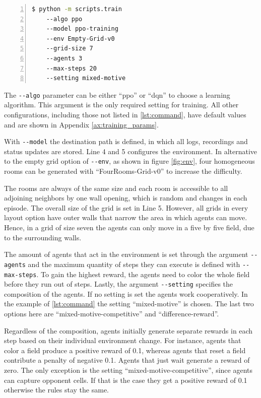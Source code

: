 \begin{lstlisting}[float=htp,caption=Exemplary command to execute training with three agents in a coloring environment using PPO as algorithm,label=lst:command,language=bash, numbers=left, numberstyle=\tiny, numbersep=8pt ,xleftmargin=3ex,xrightmargin=1ex]
$ python -m scripts.train
    --algo ppo
    --model ppo-training
    --env Empty-Grid-v0 
    --grid-size 7
    --agents 3 
    --max-steps 20
    --setting mixed-motive
\end{lstlisting}

The \verb|--algo| parameter can be either ``ppo'' or ``dqn'' to choose a learning algorithm. This argument is the only required setting for training. All other configurations, including those not listed in \ref{lst:command}, have default values and are shown in Appendix \ref{ax:training_params}.

With \verb|--model| the destination path is defined, in which all logs, recordings and status updates are stored. Line 4 and 5 configures the environment. In alternative to the empty grid option of \verb|--env|, as shown in figure \ref{fig:env}, four homogeneous rooms can be generated with ``FourRooms-Grid-v0'' to increase the difficulty. 

The rooms are always of the same size and each room is accessible to all adjoining neighbors by one wall opening, which is random and changes in each episode. The overall size of the grid is set in Line 5. However, all grids in every layout option have outer walls that narrow the area in which agents can move. Hence, in a grid of size seven the agents can only move in a five by five field, due to the surrounding walls.

The amount of agents that act in the environment is set through the argument \verb|--agents| and the maximum quantity of steps they can execute is defined with \verb|--max-steps|. To gain the highest reward, the agents need to color the whole field before they run out of steps. Lastly, the argument \verb|--setting| specifies the composition of the agents. If no setting is set the agents work cooperatively. In the example of \ref{lst:command} the setting ``mixed-motive'' is chosen. The last two options here are ``mixed-motive-competitive'' and ``difference-reward''. %

Regardless of the composition, agents initially generate separate rewards in each step based on their individual environment change. For instance, agents that color a field produce a positive reward of 0.1, whereas agents that reset a field contribute a penalty of negative 0.1. Agents that just wait generate a reward of zero. The only exception is the setting ``mixed-motive-competitive'', since agents can capture opponent cells. If that is the case they get a positive reward of 0.1 otherwise the rules stay the same. 


